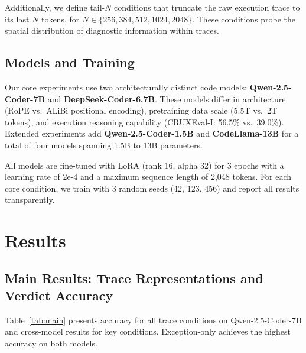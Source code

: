 \documentclass[11pt]{article}
\begin{document}
Additionally, we define tail-$N$ conditions that truncate the raw execution trace to its last $N$ tokens, for $N \in \{256, 384, 512, 1024, 2048\}$. These conditions probe the spatial distribution of diagnostic information within traces.

\subsection{Models and Training}

Our core experiments use two architecturally distinct code models: \textbf{Qwen-2.5-Coder-7B} and \textbf{DeepSeek-Coder-6.7B}. These models differ in architecture (RoPE vs.\ ALiBi positional encoding), pretraining data scale (5.5T vs.\ 2T tokens), and execution reasoning capability (CRUXEval-I: 56.5\% vs.\ 39.0\%). Extended experiments add \textbf{Qwen-2.5-Coder-1.5B} and \textbf{CodeLlama-13B} for a total of four models spanning 1.5B to 13B parameters.

All models are fine-tuned with LoRA (rank 16, alpha 32) for 3 epochs with a learning rate of 2e-4 and a maximum sequence length of 2,048 tokens. For each core condition, we train with 3 random seeds (42, 123, 456) and report all results transparently.

\section{Results}

\subsection{Main Results: Trace Representations and Verdict Accuracy}
\label{sec:main_results}

Table~\ref{tab:main} presents accuracy for all trace conditions on Qwen-2.5-Coder-7B and cross-model results for key conditions. Exception-only achieves the highest accuracy on both models.
\end{document}
